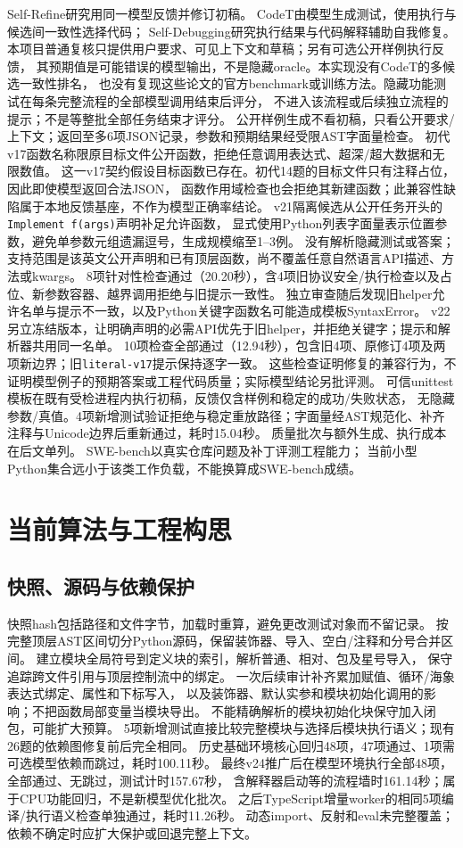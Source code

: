 \documentclass[UTF8,a4paper,11pt,fontset=fandol]{ctexart}
\begin{document}
Self-Refine\cite{selfrefine}研究用同一模型反馈并修订初稿。
CodeT\cite{codet}由模型生成测试，使用执行与候选间一致性选择代码；
Self-Debugging\cite{selfdebug}研究执行结果与代码解释辅助自我修复。
本项目普通复核只提供用户要求、可见上下文和草稿；另有可选公开样例执行反馈，
其预期值是可能错误的模型输出，不是隐藏oracle。本实现没有CodeT的多候选一致性排名，
也没有复现这些论文的官方benchmark或训练方法。隐藏功能测试在每条完整流程的全部模型调用结束后评分，
不进入该流程或后续独立流程的提示；不是等整批全部任务结束才评分。
公开样例生成不看初稿，只看公开要求/上下文；返回至多6项JSON记录，参数和预期结果经受限AST字面量检查。
初代v17函数名称限原目标文件公开函数，拒绝任意调用表达式、超深/超大数据和无限数值。
这一v17契约假设目标函数已存在。初代14题的目标文件只有注释占位，因此即使模型返回合法JSON，
函数作用域检查也会拒绝其新建函数；此兼容性缺陷属于本地反馈基座，不作为模型正确率结论。
v21隔离候选从公开任务开头的\texttt{Implement f(args)}声明补足允许函数，
显式使用Python列表字面量表示位置参数，避免单参数元组遗漏逗号，生成规模缩至1--3例。
没有解析隐藏测试或答案；支持范围是该英文公开声明和已有顶层函数，尚不覆盖任意自然语言API描述、方法或kwargs。
8项针对性检查通过（20.20秒），含4项旧协议安全/执行检查以及占位、新参数容器、越界调用拒绝与旧提示一致性。
独立审查随后发现旧helper允许名单与提示不一致，以及Python关键字函数名可能造成模板SyntaxError。
v22另立冻结版本，让明确声明的必需API优先于旧helper，并拒绝关键字；提示和解析器共用同一名单。
10项检查全部通过（12.94秒），包含旧4项、原修订4项及两项新边界；旧\texttt{literal-v17}提示保持逐字一致。
这些检查证明修复的兼容行为，不证明模型例子的预期答案或工程代码质量；实际模型结论另批评测。
可信unittest模板在既有受检进程内执行初稿，反馈仅含样例和稳定的成功/失败状态，
无隐藏参数/真值。4项新增测试验证拒绝与稳定重放路径；字面量经AST规范化、补齐注释与Unicode边界后重新通过，耗时15.04秒。
质量批次与额外生成、执行成本在后文单列。
SWE-bench\cite{swebench}以真实仓库问题及补丁评测工程能力；
当前小型Python集合远小于该类工作负载，不能换算成SWE-bench成绩。

\section{当前算法与工程构思}
\subsection{快照、源码与依赖保护}
快照hash包括路径和文件字节，加载时重算，避免更改测试对象而不留记录。
按完整顶层AST区间切分Python源码，保留装饰器、导入、空白/注释和分号合并区间。
建立模块全局符号到定义块的索引，解析普通、相对、包及星号导入，
保守追踪跨文件引用与顶层控制流中的绑定。
一次后续审计补齐累加赋值、循环/海象表达式绑定、属性和下标写入，
以及装饰器、默认实参和模块初始化调用的影响；不把函数局部变量当模块导出。
不能精确解析的模块初始化块保守加入闭包，可能扩大预算。
5项新增测试直接比较完整模块与选择后模块执行语义；现有26题的依赖图修复前后完全相同。
历史基础环境核心回归48项，47项通过、1项需可选模型依赖而跳过，耗时100.11秒。
最终v24推广后在模型环境执行全部48项，全部通过、无跳过，测试计时157.67秒，
含解释器启动等的流程墙时161.14秒；属于CPU功能回归，不是新模型优化批次。
之后TypeScript增量worker的相同5项编译/执行语义检查单独通过，耗时11.26秒。
动态import、反射和eval未完整覆盖；依赖不确定时应扩大保护或回退完整上下文。
\end{document}
